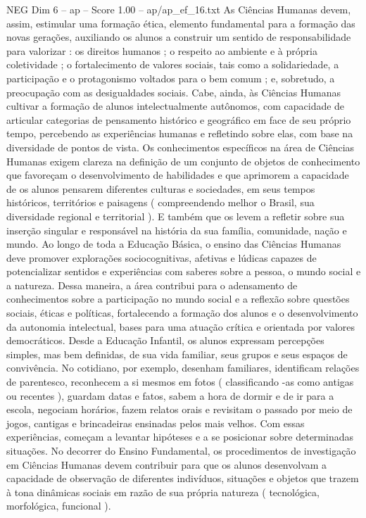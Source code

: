 \begin{textsample}{NEG Dim 6 – ap – Score 1.00 – ap/ap\_ef\_16.txt}
As Ciências Humanas devem, assim, estimular uma formação ética, elemento fundamental para a formação das novas gerações, auxiliando os alunos a construir um sentido de responsabilidade para valorizar : os direitos humanos ; o respeito ao ambiente e à própria coletividade ; o fortalecimento de valores sociais, tais como a solidariedade, a participação e o protagonismo voltados para o bem comum ; e, sobretudo, a preocupação com as desigualdades sociais.
Cabe, ainda, às Ciências Humanas cultivar a formação de alunos intelectualmente autônomos, com capacidade de articular categorias de pensamento histórico e geográfico em face de seu próprio tempo, percebendo as experiências humanas e refletindo sobre elas, com base na diversidade de pontos de vista.
Os conhecimentos específicos na área de Ciências Humanas exigem clareza na definição de um conjunto de objetos de conhecimento que favoreçam o desenvolvimento de habilidades e que aprimorem a capacidade de os alunos pensarem diferentes culturas e sociedades, em seus tempos históricos, territórios e paisagens ( compreendendo melhor o Brasil, sua diversidade regional e territorial ).
E também que os levem a refletir sobre sua inserção singular e responsável na história da sua família, comunidade, nação e mundo.
Ao longo de toda a Educação Básica, o ensino das Ciências Humanas deve promover explorações sociocognitivas, afetivas e lúdicas capazes de potencializar sentidos e experiências com saberes sobre a pessoa, o mundo social e a natureza.
Dessa maneira, a área contribui para o adensamento de conhecimentos sobre a participação no mundo social e a reflexão sobre questões sociais, éticas e políticas, fortalecendo a formação dos alunos e o desenvolvimento da autonomia intelectual, bases para uma atuação crítica e orientada por valores democráticos.
Desde a Educação Infantil, os alunos expressam percepções simples, mas bem definidas, de sua vida familiar, seus grupos e seus espaços de convivência.
No cotidiano, por exemplo, desenham familiares, identificam relações de parentesco, reconhecem a si mesmos em fotos ( classificando -as como antigas ou recentes ), guardam datas e fatos, sabem a hora de dormir e de ir para a escola, negociam horários, fazem relatos orais e revisitam o passado por meio de jogos, cantigas e brincadeiras ensinadas pelos mais velhos.
Com essas experiências, começam a levantar hipóteses e a se posicionar sobre determinadas situações.
No decorrer do Ensino Fundamental, os procedimentos de investigação em Ciências Humanas devem contribuir para que os alunos desenvolvam a capacidade de observação de diferentes indivíduos, situações e objetos que trazem à tona dinâmicas sociais em razão de sua própria natureza ( tecnológica, morfológica, funcional ).

\end{textsample}
